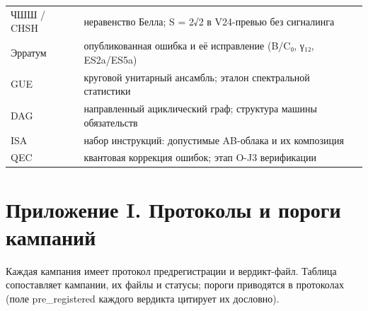 \documentclass[11pt,a4paper]{article}
\begin{document}
\begin{table}[htbp]
\begin{tabular}{p{} p{}}
ЧШШ / CHSH & неравенство Белла; S = 2√2 в V24-превью без сигналинга \\
Эрратум & опубликованная ошибка и её исправление (B/C₀, γ₁₂, ES2a/ES5a) \\
GUE & круговой унитарный ансамбль; эталон спектральной статистики \\
DAG & направленный ациклический граф; структура машины обязательств \\
ISA & набор инструкций: допустимые AB-облака и их композиция \\
QEC & квантовая коррекция ошибок; этап O-J3 верификации \\
\bottomrule
\end{tabular}
\end{table}

\section{Приложение I. Протоколы и пороги кампаний}

Каждая кампания имеет протокол предрегистрации и вердикт-файл. Таблица сопоставляет кампании, их файлы и статусы; пороги приводятся в протоколах (поле pre\_registered каждого вердикта цитирует их дословно).
\end{document}
